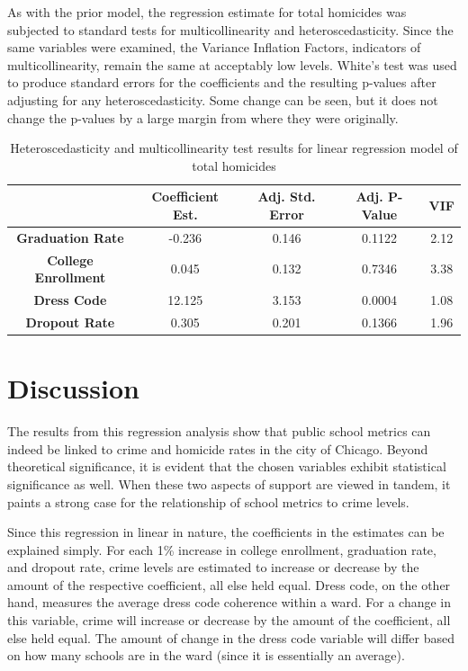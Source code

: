 \documentclass[12pt]{article}
\begin{document}
	As with the prior model, the regression estimate for total homicides was subjected to standard tests for multicollinearity and heteroscedasticity.  Since the same variables were examined, the Variance Inflation Factors, indicators of multicollinearity, remain the same at acceptably low levels.  White's test was used to produce standard errors for the coefficients and the resulting  p-values after adjusting for any heteroscedasticity.  Some change can be seen, but it does not change the p-values by a large margin from where they were originally.
	\begin{center}
	\begin{table}[h]
		\begin{tabular}{ c | c | c | c | c }
			
			& \textbf{Coefficient Est.} & \textbf{Adj. Std. Error} & \textbf{Adj. P-Value} & \textbf{VIF} \\
			\hline
			\textbf{Graduation Rate} & -0.236 & 0.146 & 0.1122 & 2.12  \\
			\textbf{College Enrollment} & 0.045 & 0.132 & 0.7346 & 3.38 \\
			\textbf{Dress Code} & 12.125 & 3.153 & 0.0004 & 1.08 \\
			\textbf{Dropout Rate} & 0.305 & 0.201 & 0.1366 & 1.96
			
		\end{tabular}
		\caption{Heteroscedasticity and multicollinearity test results for linear regression model of total homicides}
	\end{table}
\end{center}

	\section{Discussion}

The results from this regression analysis show that public school metrics can indeed be linked to crime and homicide rates in the city of Chicago.  Beyond theoretical significance, it is evident that the chosen variables exhibit statistical significance as well.  When these two aspects of support are viewed in tandem, it paints a strong case for the relationship of school metrics to crime levels.

\par
Since this regression in linear in nature, the coefficients in the estimates can be explained simply.  For each 1\% increase in college enrollment, graduation rate, and dropout rate, crime levels are estimated to increase or decrease by the amount of the respective coefficient, all else held equal.  Dress code, on the other hand, measures the average dress code coherence within a ward.  For a change in this variable, crime will increase or decrease by the amount of the coefficient, all else held equal.  The amount of change in the dress code variable will differ based on how many schools are in the ward (since it is essentially an average).
\end{document}
